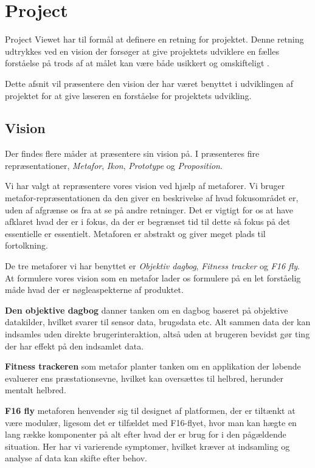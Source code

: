 \section{Project}
Project Viewet har til formål at definere en retning for projektet.
Denne retning udtrykkes ved en vision der forsøger at give projektets udviklere en fælles forståelse på trods af at målet kan være både usikkert og omskifteligt \cite[Kapitel 15 - Project]{art:essence}.

Dette afsnit vil præsentere den vision der har været benyttet i udviklingen af projektet for at give læseren en forståelse for projektets udvikling.

\subsection{Vision}
Der findes flere måder at præsentere sin vision på. 
I \citet[Kapitel 24 - Representation]{art:essence} præsenteres fire repræsentationer, \textit{Metafor}, \textit{Ikon}, \textit{Prototype} og \textit{Proposition}.

Vi har valgt at repræsentere vores vision ved hjælp af metaforer.
Vi bruger metafor-repræsentationen da den giver en beskrivelse af hvad fokusområdet er, uden af afgrænse os fra at se på andre retninger.
Det er vigtigt for os at have afklaret hvad der er i fokus, da der er begrænset tid til dette så fokus på det essentielle er essentielt.
Metaforen er abstrakt og giver meget plads til fortolkning.

De tre metaforer vi har benyttet er \textit{Objektiv dagbog}, \textit{Fitness tracker} og \textit{F16 fly}.
At formulere vores vision som en metafor lader os formulere på en let forståelig måde hvad der er nøgleaspekterne af produktet.

\textbf{Den objektive dagbog} danner tanken om en dagbog baseret på objektive datakilder, hvilket svarer til sensor data, brugsdata etc.
Alt sammen data der kan indsamles uden direkte brugerinteraktion, altså uden at brugeren bevidst gør ting der har effekt på den indsamlet data.

\textbf{Fitness trackeren} som metafor planter tanken om en applikation der løbende evaluerer ens præstationsevne, hvilket kan oversættes til helbred, herunder mentalt helbred.

\textbf{F16 fly} metaforen henvender sig til designet af platformen, der er tiltænkt at være modulær, ligesom det er tilfældet med F16-flyet, hvor man kan hægte en lang række komponenter på alt efter hvad der er brug for i den pågældende situation.
Her har vi varierende symptomer, hvilket kræver at indsamling og analyse af data kan skifte efter behov.


